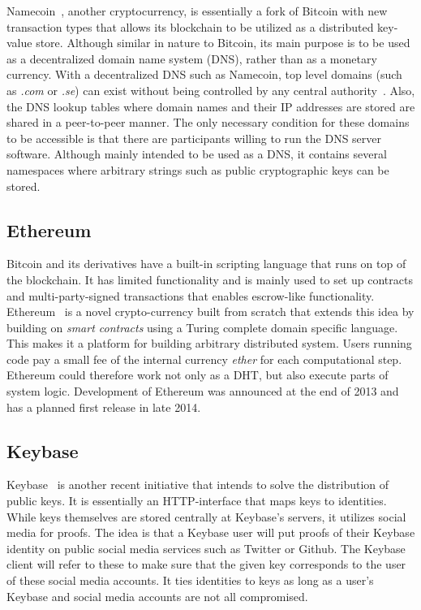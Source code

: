 Namecoin~\cite{Namecoin:Online}, another cryptocurrency, is essentially a fork of Bitcoin with new transaction types that allows its blockchain to be utilized as a distributed key-value store. Although similar in nature to Bitcoin, its main purpose is to be used as a decentralized domain name system (DNS), rather than as a monetary currency. With a decentralized DNS such as Namecoin, top level domains (such as \emph{.com} or \emph{.se}) can exist without being controlled by any central authority~\cite{Coindesk:2013:Online}. Also, the DNS lookup tables where domain names and their IP addresses are stored are shared in a peer-to-peer manner. The only necessary condition for these domains to be accessible is that there are participants willing to run the DNS server software. Although mainly intended to be used as a DNS, it contains several namespaces where arbitrary strings such as public cryptographic keys can be stored.

\subsection{Ethereum}
Bitcoin and its derivatives have a built-in scripting language that runs on top of the blockchain. It has limited functionality and is mainly used to set up contracts and multi-party-signed transactions that enables escrow-like functionality. Ethereum~\cite{Ethereum:Online} is a novel crypto-currency built from scratch that extends this idea by building on \emph{smart contracts} using a Turing complete domain specific language. This makes it a platform for building arbitrary distributed system. Users running code pay a small fee of the internal currency \emph{ether} for each computational step. Ethereum could therefore work not only as a DHT, but also execute parts of system logic. Development of Ethereum was announced at the end of 2013 and has a planned first release in late 2014.

\subsection{Keybase}
Keybase~\cite{Keybase:Online} is another recent initiative that intends to solve the distribution of public keys. It is essentially an HTTP-interface that maps keys to identities. While keys themselves are stored centrally at Keybase's servers, it utilizes social media for proofs. The idea is that a Keybase user will put proofs of their Keybase identity on public social media services such as Twitter or Github. The Keybase client will refer to these to make sure that the given key corresponds to the user of these social media accounts. It ties identities to keys as long as a user's Keybase and social media accounts are not all compromised.

